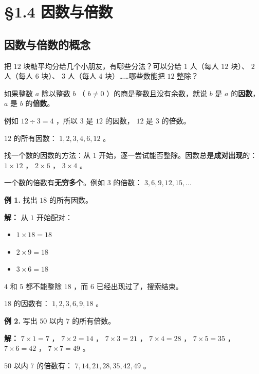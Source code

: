 \chapter{§1.4 因数与倍数}
\label{sec:1.4}





\section*{因数与倍数的概念}


\begin{explore}


把 $12$ 块糖平均分给几个小朋友，有哪些分法？可以分给 $1$ 人（每人 $12$ 块）、 $2$ 人（每人 $6$ 块）、 $3$ 人（每人 $4$ 块）……哪些数能把 $12$ 整除？

\end{explore}

\begin{understand}


如果整数 $a$ 除以整数 $b$ （ $b \neq 0$ ）的商是整数且没有余数，就说 $b$ 是 $a$ 的\textbf{因数}， $a$ 是 $b$ 的\textbf{倍数}。

例如 $12 \div 3 = 4$ ，所以 $3$ 是 $12$ 的因数， $12$ 是 $3$ 的倍数。

$12$ 的所有因数： $1, 2, 3, 4, 6, 12$ 。

找一个数的因数的方法：从 $1$ 开始，逐一尝试能否整除。因数总是\textbf{成对出现}的： $1 \times 12$ ， $2 \times 6$ ， $3 \times 4$ 。

一个数的倍数有\textbf{无穷多个}。例如 $3$ 的倍数： $3, 6, 9, 12, 15, \ldots$

\end{understand}

\begin{workedexamples}


\textbf{例 1.} 找出 $18$ 的所有因数。

\textbf{解：} 从 $1$ 开始配对：
\begin{itemize}
  \item $1 \times 18 = 18$
  \item $2 \times 9 = 18$
  \item $3 \times 6 = 18$
\end{itemize}


$4$ 和 $5$ 都不能整除 $18$ ，而 $6$ 已经出现过了，搜索结束。

$18$ 的因数有： $1, 2, 3, 6, 9, 18$ 。

\textbf{例 2.} 写出 $50$ 以内 $7$ 的所有倍数。

\textbf{解：} $7 \times 1 = 7$ ， $7 \times 2 = 14$ ， $7 \times 3 = 21$ ， $7 \times 4 = 28$ ， $7 \times 5 = 35$ ， $7 \times 6 = 42$ ， $7 \times 7 = 49$ 。

$50$ 以内 $7$ 的倍数有： $7, 14, 21, 28, 35, 42, 49$ 。

\end{workedexamples}

